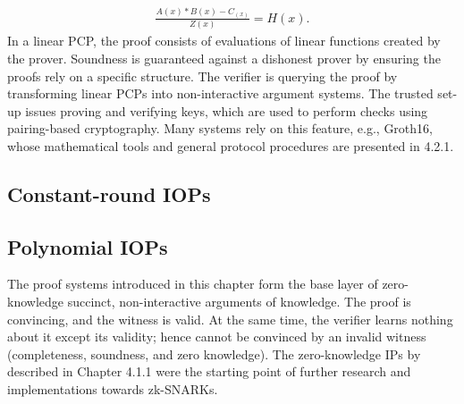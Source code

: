 \begin{align}
    \frac{A(x) * B(x) - C_(x)}{Z(x)} = H(x).
\end{align}
In a linear PCP, the proof consists of evaluations of linear functions created by the prover. Soundness is guaranteed against a dishonest prover by ensuring the proofs rely on a specific structure. The verifier is querying the proof by transforming linear PCPs into non-interactive argument systems. The trusted set-up issues proving and verifying keys, which are used to perform checks using pairing-based cryptography. Many systems rely on this feature, e.g., Groth16, whose mathematical tools and general protocol procedures are presented in 4.2.1.

\subsection{Constant-round IOPs}
\subsection{Polynomial IOPs}

The proof systems introduced in this chapter form the base layer of zero-knowledge succinct, non-interactive arguments of knowledge. The proof is convincing, and the witness is valid. At the same time, the verifier learns nothing about it except its validity; hence cannot be convinced by an invalid witness (completeness, soundness, and zero knowledge). The zero-knowledge IPs by \citet{GoldwasserIPs} described in Chapter 4.1.1 were the starting point of further research and implementations towards zk-SNARKs.

